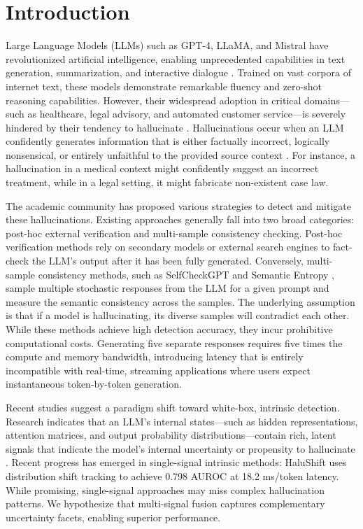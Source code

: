 \documentclass[conference]{IEEEtran}
\begin{document}
\section{Introduction}
Large Language Models (LLMs) such as GPT-4, LLaMA, and Mistral have revolutionized artificial intelligence, enabling unprecedented capabilities in text generation, summarization, and interactive dialogue \cite{huang2024trustllm, zhang2025siren}. Trained on vast corpora of internet text, these models demonstrate remarkable fluency and zero-shot reasoning capabilities. However, their widespread adoption in critical domains---such as healthcare, legal advisory, and automated customer service---is severely hindered by their tendency to hallucinate \cite{ji2023survey}. Hallucinations occur when an LLM confidently generates information that is either factually incorrect, logically nonsensical, or entirely unfaithful to the provided source context \cite{min2023factscore}. For instance, a hallucination in a medical context might confidently suggest an incorrect treatment, while in a legal setting, it might fabricate non-existent case law.

The academic community has proposed various strategies to detect and mitigate these hallucinations. Existing approaches generally fall into two broad categories: post-hoc external verification and multi-sample consistency checking. Post-hoc verification methods rely on secondary models or external search engines to fact-check the LLM's output after it has been fully generated. Conversely, multi-sample consistency methods, such as SelfCheckGPT \cite{manakul2023selfcheckgpt} and Semantic Entropy \cite{han2024semantic}, sample multiple stochastic responses from the LLM for a given prompt and measure the semantic consistency across the samples. The underlying assumption is that if a model is hallucinating, its diverse samples will contradict each other. While these methods achieve high detection accuracy, they incur prohibitive computational costs. Generating five separate responses requires five times the compute and memory bandwidth, introducing latency that is entirely incompatible with real-time, streaming applications where users expect instantaneous token-by-token generation.

Recent studies suggest a paradigm shift toward white-box, intrinsic detection. Research indicates that an LLM's internal states---such as hidden representations, attention matrices, and output probability distributions---contain rich, latent signals that indicate the model's internal uncertainty or propensity to hallucinate \cite{su2024mind, zhang2025mhad, hajji2025map}. Recent progress has emerged in single-signal intrinsic methods: HaluShift \cite{dasgupta2025hallushift} uses distribution shift tracking to achieve 0.798 AUROC at 18.2 ms/token latency. While promising, single-signal approaches may miss complex hallucination patterns. We hypothesize that multi-signal fusion captures complementary uncertainty facets, enabling superior performance.
\end{document}
